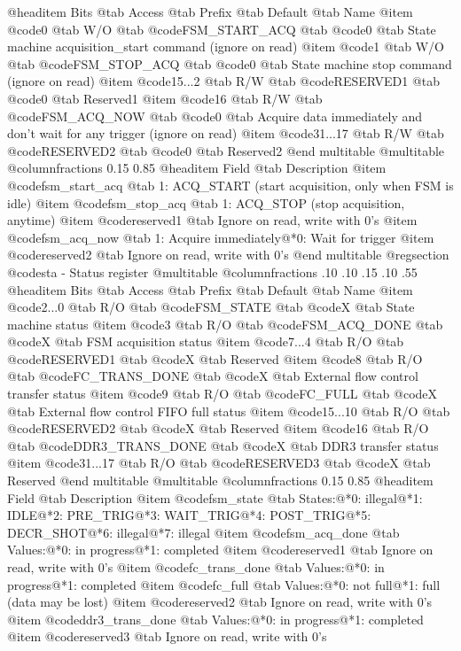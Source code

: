 @headitem Bits @tab Access @tab Prefix @tab Default @tab Name
@item @code{0}
@tab W/O @tab
@code{FSM_START_ACQ}
@tab @code{0} @tab 
State machine acquisition_start command (ignore on read)
@item @code{1}
@tab W/O @tab
@code{FSM_STOP_ACQ}
@tab @code{0} @tab 
State machine stop command (ignore on read)
@item @code{15...2}
@tab R/W @tab
@code{RESERVED1}
@tab @code{0} @tab 
Reserved1
@item @code{16}
@tab R/W @tab
@code{FSM_ACQ_NOW}
@tab @code{0} @tab 
Acquire data immediately and don't wait for any trigger (ignore on read)
@item @code{31...17}
@tab R/W @tab
@code{RESERVED2}
@tab @code{0} @tab 
Reserved2
@end multitable
@multitable @columnfractions 0.15 0.85
@headitem Field @tab Description
@item @code{fsm_start_acq} @tab 1: ACQ_START (start acquisition, only when FSM is idle)
@item @code{fsm_stop_acq} @tab 1: ACQ_STOP (stop acquisition, anytime)
@item @code{reserved1} @tab Ignore on read, write with 0's
@item @code{fsm_acq_now} @tab 1: Acquire immediately@*0: Wait for trigger
@item @code{reserved2} @tab Ignore on read, write with 0's
@end multitable
@regsection @code{sta} - Status register
@multitable @columnfractions .10 .10 .15 .10 .55
@headitem Bits @tab Access @tab Prefix @tab Default @tab Name
@item @code{2...0}
@tab R/O @tab
@code{FSM_STATE}
@tab @code{X} @tab 
State machine status
@item @code{3}
@tab R/O @tab
@code{FSM_ACQ_DONE}
@tab @code{X} @tab 
FSM acquisition status
@item @code{7...4}
@tab R/O @tab
@code{RESERVED1}
@tab @code{X} @tab 
Reserved
@item @code{8}
@tab R/O @tab
@code{FC_TRANS_DONE}
@tab @code{X} @tab 
External flow control transfer status
@item @code{9}
@tab R/O @tab
@code{FC_FULL}
@tab @code{X} @tab 
External flow control FIFO full status
@item @code{15...10}
@tab R/O @tab
@code{RESERVED2}
@tab @code{X} @tab 
Reserved
@item @code{16}
@tab R/O @tab
@code{DDR3_TRANS_DONE}
@tab @code{X} @tab 
DDR3 transfer status
@item @code{31...17}
@tab R/O @tab
@code{RESERVED3}
@tab @code{X} @tab 
Reserved
@end multitable
@multitable @columnfractions 0.15 0.85
@headitem Field @tab Description
@item @code{fsm_state} @tab States:@*0: illegal@*1: IDLE@*2: PRE_TRIG@*3: WAIT_TRIG@*4: POST_TRIG@*5: DECR_SHOT@*6: illegal@*7: illegal
@item @code{fsm_acq_done} @tab Values:@*0: in progress@*1: completed
@item @code{reserved1} @tab Ignore on read, write with 0's
@item @code{fc_trans_done} @tab Values:@*0: in progress@*1: completed
@item @code{fc_full} @tab Values:@*0: not full@*1: full (data may be lost)
@item @code{reserved2} @tab Ignore on read, write with 0's
@item @code{ddr3_trans_done} @tab Values:@*0: in progress@*1: completed
@item @code{reserved3} @tab Ignore on read, write with 0's
